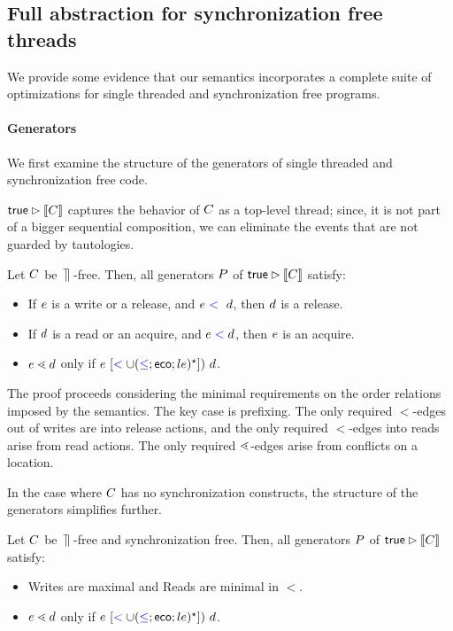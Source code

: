 \subsection{Full abstraction for synchronization free threads}
We provide some evidence that our semantics incorporates a complete suite of optimizations for single threaded and synchronization free programs.

\paragraph*{Generators}
We first examine the structure of the generators of single threaded and synchronization free code.  

$\mathsf{true}\mathbin\rhd \llbracket C\rrbracket$ captures the behavior of $C$ as a top-level thread; since, it is not part of a bigger sequential composition, we can eliminate the events that are not guarded by tautologies.
\begin{lemma}
Let $C$ be $\,\mathbin{\rrceil}\,$-free.  Then, all generators $P$ of $\mathsf{true}\mathbin\rhd \llbracket C\rrbracket$ satisfy:
\begin{itemize}
\item If $e$ is a write or a release, and $e \mathrel{{\color{blue}<}}\ d$, then $d$ is a release.
\item If $d$ is a read or an acquire, and $e \mathrel{{\color{blue}<}} d$, then $e$ is an acquire.
\item $e \lessdot d$ only if $ e\ [\mathrel{{\color{blue}<}} \cup (\mathrel{{\color{blue}\leq}}; \mathrel{\mathsf{eco}};le)^{\star}]) \  d$.
\end{itemize}
\end{lemma}
The proof proceeds considering the minimal requirements on the order relations imposed by the semantics.  The key case is prefixing.  The only required $\lt$-edges out of writes are into release actions, and the only required $\lt$-edges into reads arise from read actions.  The only required $\lessdot$-edges arise from conflicts on a location.

In the case where $C$ has no synchronization constructs, the structure of the generators simplifies further.
\begin{corollary}
Let $C$ be $\,\mathbin{\rrceil}\,$-free and synchronization free.  Then, all generators $P$ of $\mathsf{true}\mathbin\rhd \llbracket C\rrbracket$ satisfy:
\begin{itemize}
\item Writes are maximal and Reads are minimal in $\lt$.
\item $e \lessdot d$ only if $ e\ [\mathrel{{\color{blue}<}} \cup (\mathrel{{\color{blue}\leq}}; \mathrel{\mathsf{eco}};le)^{\star}]) \  d$.
\end{itemize}
\end{corollary}

